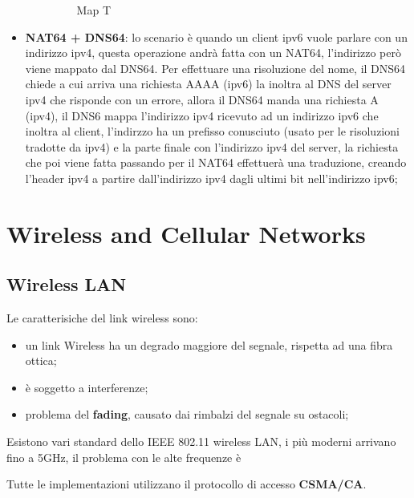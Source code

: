 \documentclass[12pt]{article}
\begin{document}
\begin{itemize}
\begin{itemize}
\begin{figure}[H]
                \caption{Map T}
                \label{fig:map-t}
            \end{figure}
    \end{itemize}
    \item \textbf{NAT64 + DNS64}:  lo scenario \`e quando un client ipv6 vuole parlare con un indirizzo ipv4, questa operazione andr\`a fatta con un NAT64, l'indirizzo per\`o viene mappato dal DNS64. Per effettuare una risoluzione del nome, il DNS64 chiede a cui arriva una richiesta AAAA (ipv6) la inoltra al DNS del server ipv4 che risponde con un errore, allora il DNS64 manda una richiesta A (ipv4), il DNS6 mappa l'indirizzo ipv4 ricevuto ad un indirizzo ipv6 che inoltra al client, l'indirzzo ha un prefisso conusciuto (usato per le risoluzioni tradotte da ipv4) e la parte finale con l'indirizzo ipv4 del server, la richiesta che poi viene fatta passando per il NAT64 effettuer\`a una traduzione, creando l'header ipv4 a partire dall'indirizzo ipv4 dagli ultimi bit nell'indirizzo ipv6;
\end{itemize}



\newpage
\section{Wireless and Cellular Networks}
\subsection{Wireless LAN}
Le caratterisiche del link wireless sono:
\begin{itemize}
    \item un link Wireless ha un degrado maggiore del segnale, rispetta ad una fibra ottica;
    \item \`e soggetto a interferenze;
    \item problema del \textbf{fading}, causato dai rimbalzi del segnale su ostacoli;
\end{itemize}
Esistono vari standard dello IEEE 802.11 wireless LAN, i pi\`u moderni arrivano fino a 5GHz, il problema con le alte frequenze \`e 

Tutte le implementazioni utilizzano il protocollo di accesso \textbf{CSMA/CA}.
\end{document}
